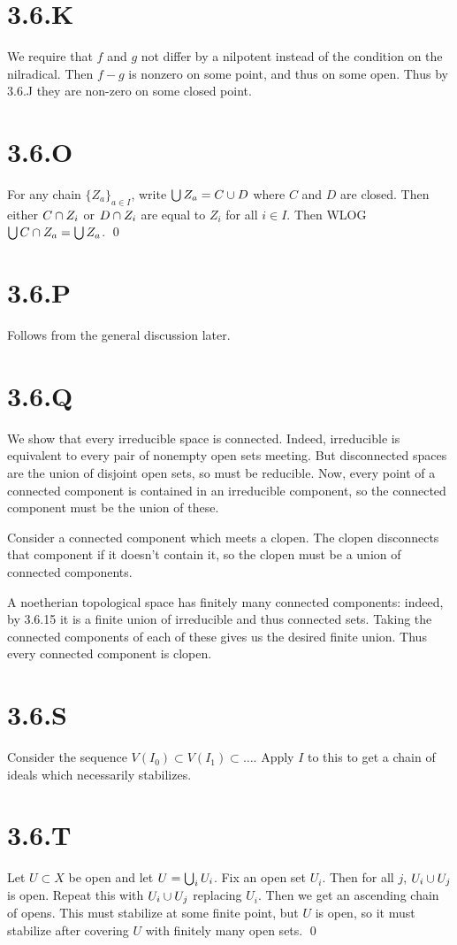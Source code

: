 \documentclass{article}
\begin{document}
\section{3.6.K}
We require that $f$ and $g$ not differ by a nilpotent instead of the condition on the nilradical. Then $f-g$ is nonzero on some point, and thus on some open. Thus by 3.6.J they are non-zero on some closed point.

\section{3.6.O}
For any chain $\{Z_a\}_{a \in I}$, write $\bigcup Z_a=C \cup D$ where $C$ and $D$ are closed. Then either $C \cap Z_i$ or $D \cap Z_i$ are equal to $Z_i$ for all $i \in I$. Then WLOG $\bigcup C \cap Z_a=\bigcup Z_a$. \qed

\section{3.6.P}
Follows from the general discussion later.

\section{3.6.Q}
We show that every irreducible space is connected. Indeed, irreducible is equivalent to every pair of nonempty open sets meeting. But disconnected spaces are the union of disjoint open sets, so must be reducible. Now, every point of a connected component is contained in an irreducible component, so the connected component must be the union of these.

Consider a connected component which meets a clopen. The clopen disconnects that component if it doesn't contain it, so the clopen must be a union of connected components.

A noetherian topological space has finitely many connected components: indeed, by 3.6.15 it is a finite union of irreducible and thus connected sets. Taking the connected components of each of these gives us the desired finite union. Thus every connected component is clopen.

\section{3.6.S}
Consider the sequence $V(I_0) \subset V(I_1) \subset \dots$. Apply $I$ to this to get a chain of ideals which necessarily stabilizes.

\section{3.6.T}
Let $U \subset X$ be open and let $U=\bigcup_i U_i$. Fix an open set $U_i$. Then for all $j$, $U_i \cup U_j$ is open. Repeat this with $U_i \cup U_j$ replacing $U_i$. Then we get an ascending chain of opens. This must stabilize at some finite point, but $U$ is open, so it must stabilize after covering $U$ with finitely many open sets. \qed
\end{document}

